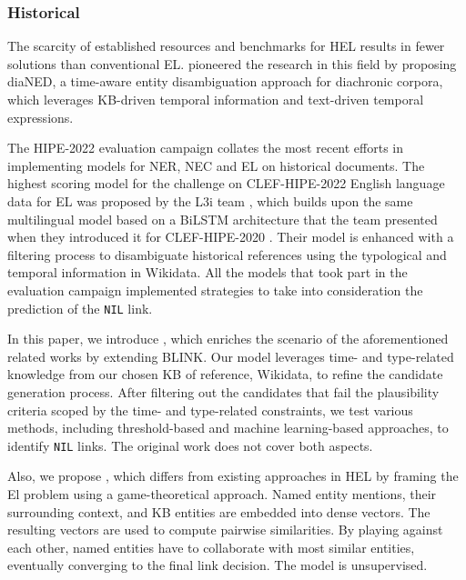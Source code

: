\subsubsection*{Historical}
The scarcity of established resources and benchmarks for HEL results in fewer solutions than conventional EL.
\citet{agarwal-etal-2018-dianed} pioneered the research in this field by proposing diaNED, a time-aware entity disambiguation approach for diachronic corpora, which leverages KB-driven temporal information and text-driven temporal expressions.

The HIPE-2022 evaluation campaign collates the most recent efforts in implementing models for NER, NEC and EL on historical documents.
The highest scoring model for the challenge on CLEF-HIPE-2022 English language data for EL was proposed by the L3i team \citep{borosKnowledgebasedContextsHistorical}, which builds upon the same multilingual model based on a BiLSTM architecture \citep{kolitsas-etal-2018-end} that the team presented when they introduced it for CLEF-HIPE-2020 \citep{boros2020robust}. %
Their model is enhanced with a filtering process \citep{linharespontes2022melhissa} to disambiguate historical references using the typological and temporal information in Wikidata. All the models that took part in the evaluation campaign implemented strategies to take into consideration the prediction of the \texttt{NIL} link.

In this paper, we introduce \modelCBLINK{}, which enriches the scenario of the aforementioned related works by extending BLINK.
Our model leverages time- and type-related knowledge from our chosen KB of reference, Wikidata, to refine the candidate generation process.
After filtering out the candidates that fail the plausibility criteria scoped by the time- and type-related constraints, we test various methods, including threshold-based and machine learning-based approaches, to identify \texttt{NIL} links. The original work does not cover both aspects.

Also, we propose \modelEL{}, which differs from existing approaches in HEL by framing the El problem using a game-theoretical approach. Named entity mentions, their surrounding context, and KB entities are embedded into dense vectors. The resulting vectors are used to compute pairwise similarities. By playing against each other, named entities have to collaborate with most similar entities, eventually converging to the final link decision. The model is unsupervised.